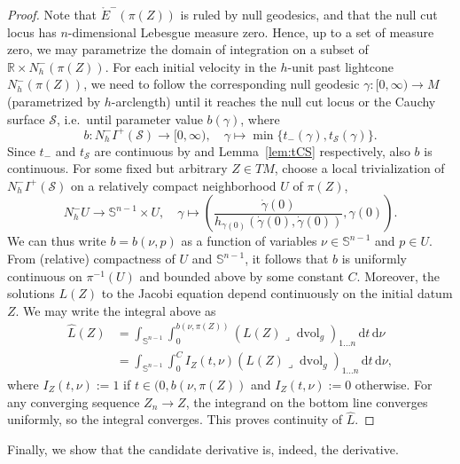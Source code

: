 \documentclass[a4paper,11pt]{amsart}
\newcommand{\R}{\mathbb{R}}
\newcommand{\vol}{\operatorname{dvol}_g}
\newcommand{\CS}{\mathcal{S}}
\newcommand{\df}{\mathrm{d}}
\begin{document}
\begin{proof}
    Note that $\mathring E^-(\pi(Z))$ is ruled by null geodesics, and that the null cut locus has $n$-dimensional Lebesgue measure zero. Hence, up to a set of measure zero, we may parametrize the domain of integration on a subset of $\R \times N^-_h(\pi(Z))$. For each initial velocity in the $h$-unit past lightcone $N^-_h(\pi(Z))$, we need to follow the corresponding null geodesic $\gamma \colon [0,\infty) \to M$ (parametrized by $h$-arclength) until it reaches the null cut locus or the Cauchy surface $\CS$, i.e.\ until parameter value $b(\gamma)$, where
    \begin{equation*}
        b \colon N_h^-I^+(\CS) \to [0,\infty),\quad \gamma \mapsto \min \{ t_-(\gamma), t_\CS (\gamma) \}.
    \end{equation*}
    Since $t_-$ and $t_\CS$ are continuous by \cite[Prop.~2.1]{CGM16} and Lemma~\ref{lem:tCS} respectively, also $b$ is continuous. For some fixed but arbitrary $Z \in TM$, choose a local trivialization of $N^-_h I^+(\CS)$ on a relatively compact neighborhood $U$ of $\pi(Z)$,
    \begin{equation*}
        N^-_h U \longrightarrow \mathbb{S}^{n-1} \times U, \quad \gamma \longmapsto \left(\frac{\dot\gamma(0)}{h_{\gamma(0)} (\dot\gamma(0),\dot\gamma(0))}, \gamma(0)\right).
    \end{equation*}
    We can thus write $b = b(\nu,p)$ as a function of variables $\nu \in \mathbb{S}^{n-1}$ and $p \in U$. From (relative) compactness of $U$ and $\mathbb{S}^{n-1}$, it follows that $b$ is uniformly continuous on $\pi^{-1}(U)$ and bounded above by some constant $C$. Moreover, the solutions $L(Z)$ to the Jacobi equation depend continuously on the initial datum $Z$. We may write the integral above as
    \begin{align*}
        \hat L(Z) &= \int_{\mathbb{S}^{n-1}} \int_0^{b(\nu,\pi(Z))} (L(Z) \lrcorner \vol)_{1...n} \, \df t\, \df \nu \\ &= \int_{\mathbb{S}^{n-1}} \int_0^{C} I_Z(t,\nu) (L(Z) \lrcorner \vol)_{1...n} \, \df t\, \df \nu,
    \end{align*}
    where $I_Z(t,\nu) := 1$ if $t \in (0,b(\nu,\pi(Z))$ and $I_Z(t,\nu) := 0$ otherwise. For any converging sequence $Z_n \to Z$, the integrand on the bottom line converges uniformly, so the integral converges. This proves continuity of $\hat L$.
\end{proof}

Finally, we show that the candidate derivative is, indeed, the derivative.
\end{document}
